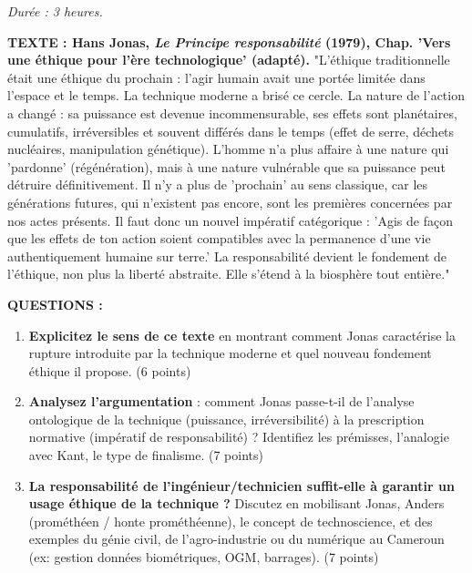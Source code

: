 \documentclass[11pt]{article}
\newcommand{\cle}[1]{{\popxbold\color{popdark}#1}}
\begin{document}
\begin{exercice}
\emph{Durée : 3 heures.}

\textbf{TEXTE : Hans Jonas, \emph{Le Principe responsabilité} (1979), Chap. 'Vers une éthique pour l'ère technologique' (adapté).}
"L'éthique traditionnelle était une éthique du prochain : l'agir humain avait une portée limitée dans l'espace et le temps. La \cle{technique} moderne a brisé ce cercle. La nature de l'action a changé : sa puissance est devenue incommensurable, ses effets sont planétaires, cumulatifs, irréversibles et souvent différés dans le temps (effet de serre, déchets nucléaires, manipulation génétique). L'homme n'a plus affaire à une nature qui 'pardonne' (régénération), mais à une nature \cle{vulnérable} que sa puissance peut détruire définitivement. Il n'y a plus de 'prochain' au sens classique, car les générations futures, qui n'existent pas encore, sont les premières concernées par nos actes présents. Il faut donc un \cle{nouvel impératif catégorique} : 'Agis de façon que les effets de ton action soient compatibles avec la permanence d'une vie authentiquement humaine sur terre.' La \cle{responsabilité} devient le fondement de l'éthique, non plus la liberté abstraite. Elle s'étend à la biosphère tout entière."

\textbf{QUESTIONS :}
\begin{enumerate}
    \item \textbf{Explicitez le sens de ce texte} en montrant comment Jonas caractérise la rupture introduite par la technique moderne et quel nouveau fondement éthique il propose. (6 points)
    \item \textbf{Analysez l'argumentation} : comment Jonas passe-t-il de l'analyse ontologique de la technique (puissance, irréversibilité) à la prescription normative (impératif de responsabilité) ? Identifiez les prémisses, l'analogie avec Kant, le type de finalisme. (7 points)
    \item \textbf{La responsabilité de l'ingénieur/technicien suffit-elle à garantir un usage éthique de la technique ?} Discutez en mobilisant Jonas, Anders (\cle{prométhéen} / \cle{honte prométhéenne}), le concept de \cle{technoscience}, et des exemples du génie civil, de l'agro-industrie ou du numérique au Cameroun (ex: gestion données biométriques, OGM, barrages). (7 points)
\end{enumerate}
\end{exercice}
\end{document}
